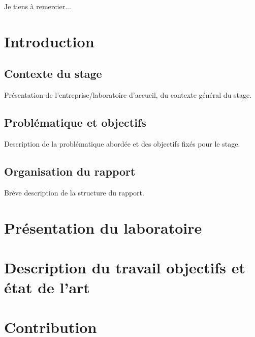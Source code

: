 \documentclass[11pt]{article}
\theoremstyle{definition}
\theoremstyle{remark}
\begin{document}
Je tiens à remercier...
\newpage

\tableofcontents

\newpage

\listoffigures
{}

\newpage

\listoftables
{}

\newpage

\section{Introduction}

\subsection{Contexte du stage}
Présentation de l'entreprise/laboratoire d'accueil, du contexte général du stage.

\subsection{Problématique et objectifs}
Description de la problématique abordée et des objectifs fixés pour le stage.

\subsection{Organisation du rapport}
Brève description de la structure du rapport.
\newpage
\section{Présentation du laboratoire}

\newpage

\section{Description du travail objectifs et état de l'art}
    
\section{Contribution}
    
\end{document}
